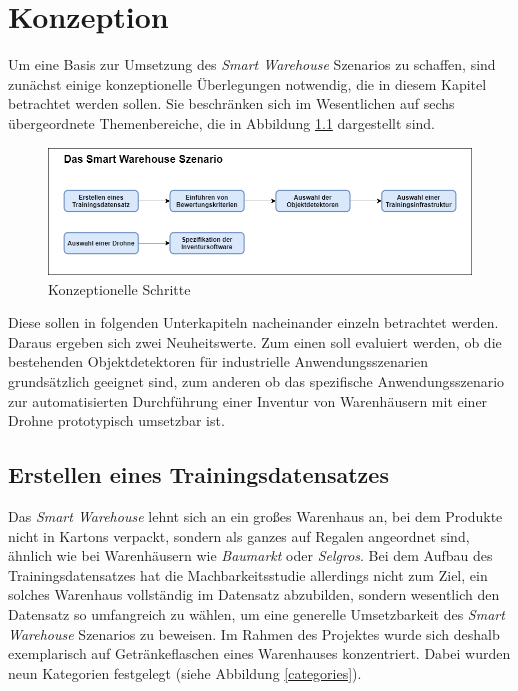 \chapter{Konzeption}

Um eine Basis zur Umsetzung des \textit{Smart Warehouse} Szenarios zu schaffen, sind zunächst einige konzeptionelle Überlegungen notwendig, die in diesem Kapitel betrachtet werden sollen. Sie beschränken sich im Wesentlichen auf sechs übergeordnete Themenbereiche, die in Abbildung \ref{schritte} dargestellt sind. 

\begin{figure}[ht]
	\begin{center}
		\includegraphics[width=15cm]{Bilder/blockdiagramm.png} 
		\caption[Konzeptionelle Schritte]{Konzeptionelle Schritte}
		\label{schritte}
	\end{center}
\end{figure}

Diese sollen in folgenden Unterkapiteln nacheinander einzeln betrachtet werden. Daraus ergeben sich zwei Neuheitswerte. Zum einen soll evaluiert werden, ob die bestehenden Objektdetektoren für industrielle Anwendungsszenarien grundsätzlich geeignet sind, zum anderen ob das spezifische Anwendungsszenario zur automatisierten Durchführung einer Inventur von Warenhäusern mit einer Drohne prototypisch umsetzbar ist.

\section{Erstellen eines Trainingsdatensatzes}

Das \textit{Smart Warehouse} lehnt sich an ein großes Warenhaus an, bei dem Produkte nicht in Kartons verpackt, sondern als ganzes auf Regalen angeordnet sind, ähnlich wie bei Warenhäusern wie \textit{Baumarkt} oder \textit{Selgros}. Bei dem Aufbau des Trainingsdatensatzes hat die Machbarkeitsstudie allerdings nicht zum Ziel, ein solches Warenhaus vollständig im Datensatz abzubilden, sondern wesentlich den Datensatz so umfangreich zu wählen, um eine generelle Umsetzbarkeit des \textit{Smart Warehouse} Szenarios zu beweisen. Im Rahmen des Projektes wurde sich deshalb exemplarisch auf Getränkeflaschen eines Warenhauses konzentriert. Dabei wurden neun Kategorien festgelegt (siehe Abbildung \ref{categories}). 

